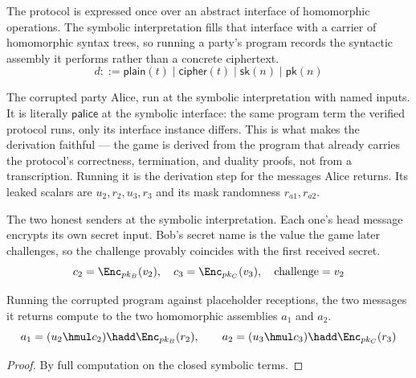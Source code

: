 \begin{definition}
  \label{def:symbolic_interface}
  \rocqok
  The protocol is expressed once over an abstract interface of homomorphic
  operations. The symbolic interpretation fills that interface with a carrier of
  homomorphic syntax trees, so running a party's program records the syntactic
  assembly it performs rather than a concrete ciphertext.
  \[ d ::= \mathsf{plain}(t) \mid \mathsf{cipher}(t) \mid \mathsf{sk}(n)
        \mid \mathsf{pk}(n) \]
\end{definition}

\begin{definition}
  \label{def:palice_sym}
  \rocqok
  The corrupted party Alice, run at the symbolic interpretation with named
  inputs. It is literally $\mathsf{palice}$ at the symbolic interface: the same
  program term the verified protocol runs, only its interface instance differs.
  This is what makes the derivation faithful --- the game is derived from the
  program that already carries the protocol's correctness, termination, and
  duality proofs, not from a transcription. Running it is the derivation step for
  the messages Alice returns. Its leaked scalars are $u_2,r_2,u_3,r_3$ and its
  mask randomness $r_{a1},r_{a2}$.
\end{definition}

\begin{definition}
  \label{def:sender_programs}
  \rocqok
  The two honest senders at the symbolic interpretation. Each one's head message
  encrypts its own secret input. Bob's secret name is the value the game later
  challenges, so the challenge provably coincides with the first received secret.
  \[ c_2 = \Enc_{pk_B}(v_2), \quad c_3 = \Enc_{pk_C}(v_3), \quad
        \text{challenge} = v_2 \]
\end{definition}

\begin{lemma}
  \label{lem:observed_combines}
  \rocqok
  Running the corrupted program against placeholder receptions, the two messages
  it returns compute to the two homomorphic assemblies $a_1$ and $a_2$.
  \[ a_1 = (u_2 \hmul c_2) \hadd \Enc_{pk_B}(r_2), \qquad
        a_2 = (u_3 \hmul c_3) \hadd \Enc_{pk_C}(r_3) \]
\end{lemma}
\begin{proof}
  \rocqok
  By full computation on the closed symbolic terms.
\end{proof}

